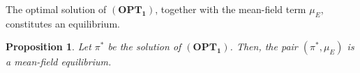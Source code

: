 \documentclass[11pt]{article}
\newcommand{\sX}{{\mathsf X}}
\newcommand{\sA}{{\mathsf A}}
\newcommand{\Pnew}{{\mathcal P}}
\newtheorem{proposition}{Proposition}[section]
\begin{document}
The optimal solution of \(\mathbf{(OPT_1)}\), together with the mean-field term \(\mu_E\), constitutes an equilibrium.

                                 


\begin{proposition} \label{pr2}
Let $\pi^*$ be the solution of $\mathbf{(OPT_1)}$. Then, the pair $(\pi^*,\mu_E)$ is a mean-field equilibrium.
\end{proposition}
\end{document}
